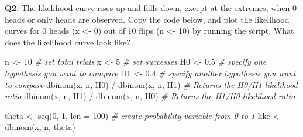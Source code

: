 \documentclass[
  oneside]{book}
\newenvironment{Shaded}{\begin{snugshade}}{\end{snugshade}}
\newcommand{\AttributeTok}[1]{\textcolor[rgb]{0.77,0.63,0.00}{#1}}
\newcommand{\CommentTok}[1]{\textcolor[rgb]{0.56,0.35,0.01}{\textit{#1}}}
\newcommand{\DecValTok}[1]{\textcolor[rgb]{0.00,0.00,0.81}{#1}}
\newcommand{\FloatTok}[1]{\textcolor[rgb]{0.00,0.00,0.81}{#1}}
\newcommand{\FunctionTok}[1]{\textcolor[rgb]{0.00,0.00,0.00}{#1}}
\newcommand{\NormalTok}[1]{#1}
\newcommand{\OtherTok}[1]{\textcolor[rgb]{0.56,0.35,0.01}{#1}}
\newcommand{\SpecialCharTok}[1]{\textcolor[rgb]{0.00,0.00,0.00}{#1}}
\begin{document}
\textbf{Q2}: The likelihood curve rises up and falls down, except at the extremes, when 0 heads or only heads are observed. Copy the code below, and plot the likelihood curves for 0 heads (x \textless- 0) out of 10 flips (n \textless- 10) by running the script. What does the likelihood curve look like?

\begin{Shaded}
\begin{Highlighting}[]
\NormalTok{n }\OtherTok{\textless{}{-}} \DecValTok{10} \CommentTok{\# set total trials}
\NormalTok{x }\OtherTok{\textless{}{-}} \DecValTok{5} \CommentTok{\# set successes}
\NormalTok{H0 }\OtherTok{\textless{}{-}} \FloatTok{0.5} \CommentTok{\# specify one hypothesis you want to compare}
\NormalTok{H1 }\OtherTok{\textless{}{-}} \FloatTok{0.4} \CommentTok{\# specify another hypothesis you want to compare}
\FunctionTok{dbinom}\NormalTok{(x, n, H0) }\SpecialCharTok{/} \FunctionTok{dbinom}\NormalTok{(x, n, H1) }\CommentTok{\# Returns the H0/H1 likelihood ratio}
\FunctionTok{dbinom}\NormalTok{(x, n, H1) }\SpecialCharTok{/} \FunctionTok{dbinom}\NormalTok{(x, n, H0) }\CommentTok{\# Returns the H1/H0 likelihood ratio}

\NormalTok{theta }\OtherTok{\textless{}{-}} \FunctionTok{seq}\NormalTok{(}\DecValTok{0}\NormalTok{, }\DecValTok{1}\NormalTok{, }\AttributeTok{len =} \DecValTok{100}\NormalTok{) }\CommentTok{\# create probability variable from 0 to 1}
\NormalTok{like }\OtherTok{\textless{}{-}} \FunctionTok{dbinom}\NormalTok{(x, n, theta)}


\end{Highlighting}
\end{Shaded}
\end{document}
